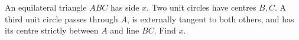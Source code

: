 An equilateral triangle $ABC$ has side $x$. Two unit circles have centres $B,C$. A third unit circle passes through $A$, is externally tangent to both others, and has its centre strictly between $A$ and line $BC$. Find $x$.
